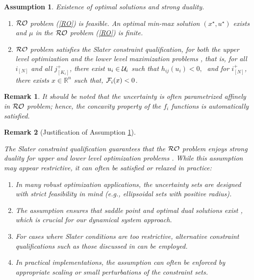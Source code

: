 \documentclass[journal,twoside,web]{ieeecolor}
\newcommand{\rev}[1]{\textcolor{revisionblue}{#1}}
\newtheorem{assumption}[theorem]{Assumption}
\newtheorem{remark}{Remark}
\begin{document}
\begin{assumption} \label{assume_feasible} Existence of optimal solutions and strong duality.

\begin{enumerate}
\item ${\cal RO}$ problem (\ref{RO}) is feasible. An optimal min-max solution $(x^\star,u^\star)$ exists and $\mu$ in the ${\cal RO}$ problem (\ref{RO}) is finite.
\item ${\cal RO}$ problem satisfies the Slater constraint qualification, for both the upper level optimization and the lower level maximization problems
 \cite{bental2009-2}, that is,
for all $i_{[N]}$ and all $j^+_{[K_i]}$, there exist $u_i \in {\cal U}_i$ such that $h_{ij}(u_i)<0,\;$  and
for $i^+_{[N]}$,  there exists $x \in \mathbb{R}^n$ such that, ${\cal F}_i(x)<0$\;.
\end{enumerate}
\end{assumption}
\begin{remark}
    It should be noted that the uncertainty is often parametrized affinely in ${\cal RO}$ problem; hence, the concavity property of the $f_i$ functions is automatically satisfied.
\end{remark}
\begin{remark}[\rev{Justification of Assumption \ref{assume_feasible}}] \label{strong_duality_rem}
\rev{The Slater constraint qualification guarantees that the ${\cal RO}$ problem enjoys strong duality for upper and lower level optimization problems \cite[Section~5.2.3, 5.9.1]{boyd2004}. While this assumption may appear restrictive, it can often be satisfied or relaxed in practice:
\begin{enumerate}
\item In many robust optimization applications, the uncertainty sets are designed with strict feasibility in mind (e.g., ellipsoidal sets with positive radius).
\item The assumption ensures that saddle point and optimal dual solutions exist \cite{bental2009-2}, which is crucial for our dynamical system approach.
\item For cases where Slater conditions are too restrictive, alternative constraint qualifications such as those discussed in \cite{jeyakumar2010} can be employed.
\item In practical implementations, the assumption can often be enforced by appropriate scaling or small perturbations of the constraint sets.
\end{enumerate}}
\end{remark}
\end{document}
